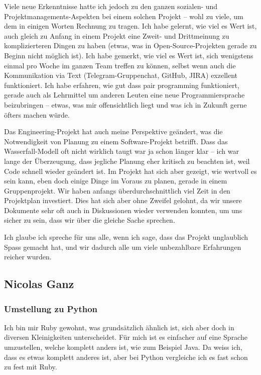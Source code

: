 \documentclass[a4paper]{article}
\begin{document}
Viele neue Erkenntnisse hatte ich jedoch zu den ganzen sozialen- und
Projektmanagements-Aspekten bei einem solchen Projekt -- wohl zu viele, um dem
in einigen Worten Rechnung zu tragen. Ich habe gelernt, wie viel es Wert ist,
auch gleich zu Anfang in einem Projekt eine Zweit- und Drittmeinung zu
komplizierteren Dingen zu haben (etwas, was in Open-Source-Projekten gerade zu
Beginn nicht möglich ist). Ich habe gemerkt, wie viel es Wert ist, sich
wenigstens einmal pro Woche im ganzen Team treffen zu können, selbst wenn auch
die Kommunikation via Text (Telegram-Gruppenchat, GitHub, JIRA) exzellent
funktioniert. Ich habe erfahren, wie gut dass pair programming funktioniert,
gerade auch als Lehrmittel um anderen Leuten eine neue Programmiersprache
beizubringen -- etwas, was mir offensichtlich liegt und was ich in Zukunft gerne
öfters machen würde.

Das Engineering-Projekt hat auch meine Perspektive geändert, was die
Notwendigkeit von Planung zu einem Software-Projekt betrifft. Dass das
Wasserfall-Modell oft nicht wirklich taugt war ja schon länger klar -- ich war
lange der Überzeugung, dass jegliche Planung eher kritisch zu beachten ist, weil
Code schnell wieder geändert ist. Im Projekt hat sich aber gezeigt, wie wertvoll
es sein kann, eben doch einige Dinge im Voraus zu planen, gerade in einem
Gruppenprojekt. Wir haben anfangs überdurchschnittlich viel Zeit in den
Projektplan investiert. Dies hat sich aber ohne Zweifel gelohnt, da wir unsere
Dokumente sehr oft auch in Diskussionen wieder verwenden konnten, um uns sicher
zu sein, dass wir über die gleiche Sache sprechen.

Ich glaube ich spreche für uns alle, wenn ich sage, dass das Projekt
unglaublich Spass gemacht hat, und wir dadurch alle um viele unbezahlbare
Erfahrungen reicher wurden.

\pagebreak

\subsection{Nicolas Ganz}

\subsubsection{Umstellung zu Python}

Ich bin mir Ruby gewohnt, was grundsätzlich ähnlich ist, sich aber doch in diversen Kleinigkeiten unterscheidet.
Für mich ist es einfacher auf eine Sprache umzustellen, welche komplett anders ist, wie zum Beispiel Java.
Da weiss ich, dass es etwas komplett anderes ist, aber bei Python vergleiche ich es fast schon zu fest mit Ruby.
\end{document}
